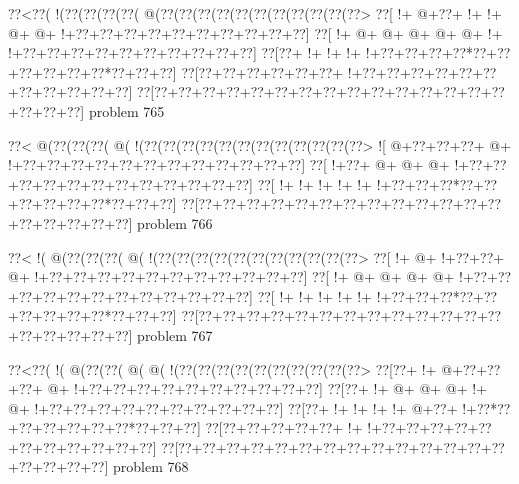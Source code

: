 \vbox{\vbox{\goo
\0??<\0??(\- !(\0??(\0??(\0??(\0??(\- @(\0??(\0??(\0??(\0??(\0??(\0??(\0??(\0??(\0??(\0??(\0??>
\0??[\- !+\- @+\0??+\- !+\- !+\- @+\- @+\- !+\0??+\0??+\0??+\0??+\0??+\0??+\0??+\0??+\0??+\0??]
\0??[\- !+\- @+\- @+\- @+\- @+\- @+\- !+\- !+\0??+\0??+\0??+\0??+\0??+\0??+\0??+\0??+\0??+\0??]
\0??[\0??+\- !+\- !+\- !+\- !+\0??+\0??+\0??+\0??*\0??+\0??+\0??+\0??+\0??+\0??*\0??+\0??+\0??]
\0??[\0??+\0??+\0??+\0??+\0??+\0??+\- !+\0??+\0??+\0??+\0??+\0??+\0??+\0??+\0??+\0??+\0??+\0??]
\0??[\0??+\0??+\0??+\0??+\0??+\0??+\0??+\0??+\0??+\0??+\0??+\0??+\0??+\0??+\0??+\0??+\0??+\0??]
}
\hfil problem 765\hfil\break
}



\vbox{\vbox{\goo
\0??<\- @(\0??(\0??(\0??(\- @(\- !(\0??(\0??(\0??(\0??(\0??(\0??(\0??(\0??(\0??(\0??(\0??(\0??>
\- ![\- @+\0??+\0??+\0??+\- @+\- !+\0??+\0??+\0??+\0??+\0??+\0??+\0??+\0??+\0??+\0??+\0??+\0??]
\0??[\- !+\0??+\- @+\- @+\- @+\- !+\0??+\0??+\0??+\0??+\0??+\0??+\0??+\0??+\0??+\0??+\0??+\0??]
\0??[\- !+\- !+\- !+\- !+\- !+\- !+\0??+\0??+\0??*\0??+\0??+\0??+\0??+\0??+\0??*\0??+\0??+\0??]
\0??[\0??+\0??+\0??+\0??+\0??+\0??+\0??+\0??+\0??+\0??+\0??+\0??+\0??+\0??+\0??+\0??+\0??+\0??]
}
\hfil problem 766\hfil\break
}



\vbox{\vbox{\goo
\0??<\- !(\- @(\0??(\0??(\0??(\- @(\- !(\0??(\0??(\0??(\0??(\0??(\0??(\0??(\0??(\0??(\0??(\0??>
\0??[\- !+\- @+\- !+\0??+\0??+\- @+\- !+\0??+\0??+\0??+\0??+\0??+\0??+\0??+\0??+\0??+\0??+\0??]
\0??[\- !+\- @+\- @+\- @+\- @+\- !+\0??+\0??+\0??+\0??+\0??+\0??+\0??+\0??+\0??+\0??+\0??+\0??]
\0??[\- !+\- !+\- !+\- !+\- !+\- !+\0??+\0??+\0??*\0??+\0??+\0??+\0??+\0??+\0??*\0??+\0??+\0??]
\0??[\0??+\0??+\0??+\0??+\0??+\0??+\0??+\0??+\0??+\0??+\0??+\0??+\0??+\0??+\0??+\0??+\0??+\0??]
}
\hfil problem 767\hfil\break
}



\vbox{\vbox{\goo
\0??<\0??(\- !(\- @(\0??(\0??(\- @(\- @(\- !(\0??(\0??(\0??(\0??(\0??(\0??(\0??(\0??(\0??(\0??>
\0??[\0??+\- !+\- @+\0??+\0??+\0??+\- @+\- !+\0??+\0??+\0??+\0??+\0??+\0??+\0??+\0??+\0??+\0??]
\0??[\0??+\- !+\- @+\- @+\- @+\- !+\- @+\- !+\0??+\0??+\0??+\0??+\0??+\0??+\0??+\0??+\0??+\0??]
\0??[\0??+\- !+\- !+\- !+\- !+\- @+\0??+\- !+\0??*\0??+\0??+\0??+\0??+\0??+\0??*\0??+\0??+\0??]
\0??[\0??+\0??+\0??+\0??+\0??+\- !+\- !+\0??+\0??+\0??+\0??+\0??+\0??+\0??+\0??+\0??+\0??+\0??]
\0??[\0??+\0??+\0??+\0??+\0??+\0??+\0??+\0??+\0??+\0??+\0??+\0??+\0??+\0??+\0??+\0??+\0??+\0??]
}
\hfil problem 768\hfil\break
}




